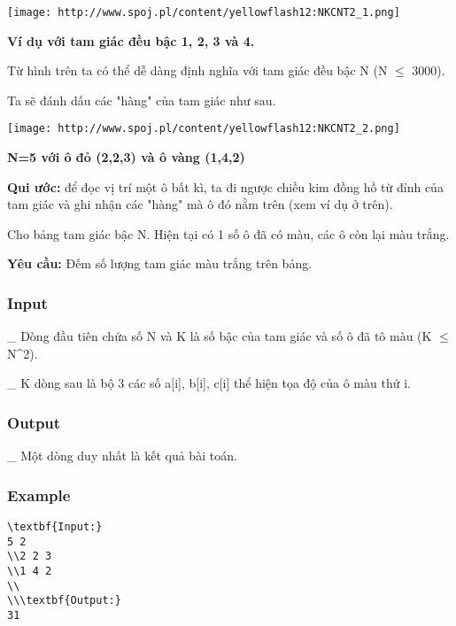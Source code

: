 




\texttt{[image: http://www.spoj.pl/content/yellowflash12:NKCNT2\_1.png]}

\textbf{    Ví dụ với tam giác đều bậc 1, 2, 3 và 4.   }

   Từ hình trên ta có thể dễ dàng định nghĩa với tam giác đều bậc N (N  $\le$  3000).  

   Ta sẽ đánh dấu các "hàng" của tam giác như sau.  


\texttt{[image: http://www.spoj.pl/content/yellowflash12:NKCNT2\_2.png]}

\textbf{    N=5 với ô đỏ (2,2,3) và ô vàng (1,4,2)   }

\textbf{    Qui ước:   }   để đọc vị trí một ô bất kì, ta đi ngược chiều kim đồng hồ từ đỉnh của tam giác và ghi nhận các "hàng" mà ô đó nằm trên (xem ví dụ ở trên).  

   Cho bảng tam giác bậc N. Hiện tại có 1 số ô đã có màu, các ô còn lại màu trắng.  

\textbf{    Yêu cầu:   }   Đếm số lượng tam giác màu trắng trên bảng.  

\subsubsection{   Input  }

   \_ Dòng đầu tiên chứa số N và K là số bậc của tam giác và số ô đã tô màu (K  $\le$  N^2).  

   \_ K dòng sau là bộ 3 các số a[i], b[i], c[i] thể hiện tọa độ của ô màu thứ i.  

\subsubsection{   Output  }

   \_ Một dòng duy nhất là kết quả bài toán.  

\subsubsection{   Example  }
\begin{verbatim}
\textbf{Input:}
5 2
\\2 2 3
\\1 4 2
\\
\\\textbf{Output:}
31
\end{verbatim}
